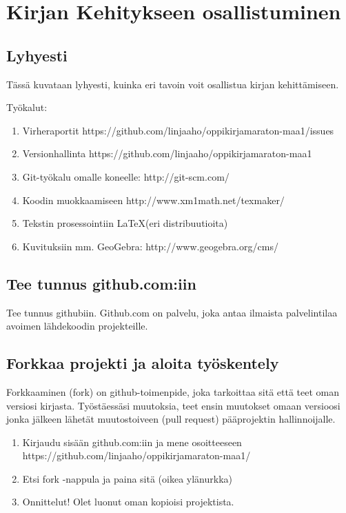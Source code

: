 \chapter{Kirjan Kehitykseen osallistuminen}

\section{Lyhyesti}

Tässä kuvataan lyhyesti, kuinka eri tavoin voit osallistua kirjan kehittämiseen.

Työkalut:

\begin{enumerate}

\item Virheraportit https://github.com/linjaaho/oppikirjamaraton-maa1/issues
\item Versionhallinta https://github.com/linjaaho/oppikirjamaraton-maa1
\item Git-työkalu omalle koneelle: http://git-scm.com/
\item Koodin muokkaamiseen http://www.xm1math.net/texmaker/
\item Tekstin prosessointiin \LaTeX (eri distribuutioita)
\item Kuvituksiin mm. GeoGebra: http://www.geogebra.org/cms/

\end{enumerate}

\section{Tee tunnus github.com:iin}

Tee tunnus githubiin. Github.com on palvelu, joka antaa ilmaista palvelintilaa avoimen lähdekoodin projekteille.


\section{Forkkaa projekti ja aloita työskentely}

Forkkaaminen (fork) on github-toimenpide, joka tarkoittaa sitä että teet oman versiosi kirjasta. Työstäessäsi muutoksia, teet ensin muutokset omaan versioosi jonka jälkeen lähetät muutostoiveen (pull request) pääprojektin hallinnoijalle.

\begin{enumerate}

\item Kirjaudu sisään github.com:iin ja mene osoitteeseen https://github.com/linjaaho/oppikirjamaraton-maa1/
\item Etsi fork -nappula ja paina sitä (oikea ylänurkka)
\item Onnittelut! Olet luonut oman kopioisi projektista. 

\end{enumerate}

